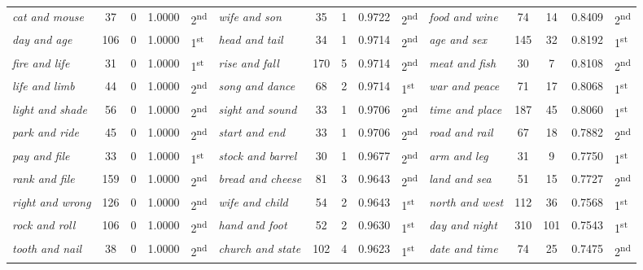 \begin{table}
{\begin{tabular}[t]{l *{2}{S[table-format=3]} S[table-format=1.4] l  l *{2}{S[table-format=3]} S[table-format=1.4] l  l *{2}{S[table-format=3]} S[table-format=1.4] l}
\textit{cat and mouse} & 37 & 0 & 1.0000 & 2\textsuperscript{nd} & \textit{wife and son} & 35 & 1 & 0.9722 & 2\textsuperscript{nd} & \textit{food and wine} & 74 & 14 & 0.8409 & 2\textsuperscript{nd} \\
\textit{day and age} & 106 & 0 & 1.0000 & 1\textsuperscript{st} & \textit{head and tail} & 34 & 1 & 0.9714 & 2\textsuperscript{nd} & \textit{age and sex} & 145 & 32 & 0.8192 & 1\textsuperscript{st} \\
\textit{fire and life} & 31 & 0 & 1.0000 & 1\textsuperscript{st} & \textit{rise and fall} & 170 & 5 & 0.9714 & 2\textsuperscript{nd} & \textit{meat and fish} & 30 & 7 & 0.8108 & 2\textsuperscript{nd} \\
\textit{life and limb} & 44 & 0 & 1.0000 & 2\textsuperscript{nd} & \textit{song and dance} & 68 & 2 & 0.9714 & 1\textsuperscript{st} & \textit{war and peace} & 71 & 17 & 0.8068 & 1\textsuperscript{st} \\
\textit{light and shade} & 56 & 0 & 1.0000 & 2\textsuperscript{nd} & \textit{sight and sound} & 33 & 1 & 0.9706 & 2\textsuperscript{nd} & \textit{time and place} & 187 & 45 & 0.8060 & 1\textsuperscript{st} \\
\textit{park and ride} & 45 & 0 & 1.0000 & 2\textsuperscript{nd} & \textit{start and end} & 33 & 1 & 0.9706 & 2\textsuperscript{nd} & \textit{road and rail} & 67 & 18 & 0.7882 & 2\textsuperscript{nd} \\
\textit{pay and file} & 33 & 0 & 1.0000 & 1\textsuperscript{st} & \textit{stock and barrel} & 30 & 1 & 0.9677 & 2\textsuperscript{nd} & \textit{arm and leg} & 31 & 9 & 0.7750 & 1\textsuperscript{st} \\
\textit{rank and file} & 159 & 0 & 1.0000 & 2\textsuperscript{nd} & \textit{bread and cheese} & 81 & 3 & 0.9643 & 2\textsuperscript{nd} & \textit{land and sea} & 51 & 15 & 0.7727 & 2\textsuperscript{nd} \\
\textit{right and wrong} & 126 & 0 & 1.0000 & 2\textsuperscript{nd} & \textit{wife and child} & 54 & 2 & 0.9643 & 1\textsuperscript{st} & \textit{north and west} & 112 & 36 & 0.7568 & 1\textsuperscript{st} \\
\textit{rock and roll} & 106 & 0 & 1.0000 & 2\textsuperscript{nd} & \textit{hand and foot} & 52 & 2 & 0.9630 & 1\textsuperscript{st} & \textit{day and night} & 310 & 101 & 0.7543 & 1\textsuperscript{st} \\
\textit{tooth and nail} & 38 & 0 & 1.0000 & 2\textsuperscript{nd} & \textit{church and state} & 102 & 4 & 0.9623 & 1\textsuperscript{st} & \textit{date and time} & 74 & 25 & 0.7475 & 2\textsuperscript{nd} \\

\end{tabular}}
\end{table}
